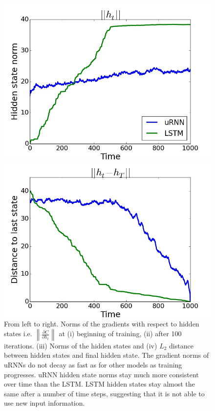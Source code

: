 \documentclass{article} %
\newcommand\norm[1]{\left\lVert#1\right\rVert}
\begin{document}
\begin{figure}[t!]
\begin{minipage}[b]{0.25\linewidth}
    \includegraphics[scale=0.125]{figures/hnorms.jpeg}
  \end{minipage}%
  \begin{minipage}[b]{0.25\linewidth}
    \centering
    \includegraphics[scale=0.125]{figures/hdiff.jpeg}
  \end{minipage}
  \caption{From left to right. Norms of the gradients with respect to hidden states i.e.  
   $\norm{\frac{\partial C}{\partial h_t}}$ at (i) beginning of training, (ii) after 100 iterations.
   (iii) Norms of the hidden states and (iv) $L_2$ distance between hidden states and final hidden state.
   The gradient norms of uRNNs do not decay as fast as for other models as training progresses.
uRNN hidden state norms stay much more consistent over time than the LSTM. 
         LSTM hidden states stay almost the same after a number of time steps, 
         suggesting that it is not able to use new input information.
}
  \label{fig:gradnorms} 
\end{figure}
\end{document}
